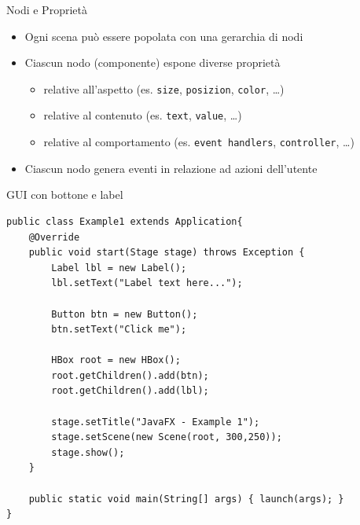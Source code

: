 \documentclass[presentation]{beamer}
\begin{document}
\begin{frame}{Nodi e Proprietà}
\begin{itemize}\itemsep10pt
\item Ogni scena può essere popolata con una gerarchia di nodi
\item Ciascun nodo (componente) espone diverse proprietà
\begin{itemize}
\item relative all'aspetto (es. \texttt{size}, \texttt{posizion}, \texttt{color}, \dots)
\item relative al contenuto (es. \texttt{text}, \texttt{value}, \dots)
\item relative al comportamento (es. \texttt{event handlers}, \texttt{controller}, \dots)
\end{itemize}
\item Ciascun nodo genera eventi in relazione ad azioni dell'utente
\end{itemize}
\end{frame}

\begin{frame}[fragile]{GUI con bottone e label}
\begin{lstlisting}
public class Example1 extends Application{
	@Override
	public void start(Stage stage) throws Exception {
		Label lbl = new Label();
		lbl.setText("Label text here...");
		
		Button btn = new Button();
		btn.setText("Click me");
		
		HBox root = new HBox();
		root.getChildren().add(btn);
		root.getChildren().add(lbl);
				
		stage.setTitle("JavaFX - Example 1");
		stage.setScene(new Scene(root, 300,250));
		stage.show();
	}
	
	public static void main(String[] args) { launch(args); }
}
\end{lstlisting}
\end{frame}
\end{document}
